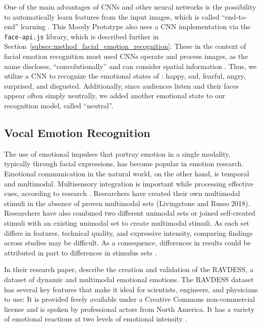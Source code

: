 One of the main advantages of CNNs and other neural networks is the possibility to automatically learn features from the input images, which is called ``end-to-end'' learning \cite{ko_brief_2018}. This Moody Prototype also uses a CNN implementation via the \texttt{face-api.js} library, which is described further in Section~\ref{subsec:method_facial_emotion_recognition}. These in the context of facial emotion recognition most used CNNs operate and process images, as the name discloses, ``convolutionally'' and can consider spatial information \cite{ko_brief_2018, rosler_reducing_2021}. Thus, we utilize a CNN to recognize the emotional states of : happy, sad, fearful, angry, surprised, and disgusted. Additionally, since audiences listen and their faces appear often simply neutrally, we added another emotional state to our recognition model, called ``neutral''.

\subsection{Vocal Emotion Recognition}
\label{subsec:related_work_vocal_emotion_recognition}
The use of emotional impulses that portray emotion in a single modality, typically through facial expressions, has become popular in emotion research. Emotional communication in the natural world, on the other hand, is temporal and multimodal. Multisensory integration is important while processing effective cues, according to research \cite{livingstone_ryerson_2018}. Researchers have created their own multimodal stimuli in the absence of proven multimodal sets (Livingstone and Russo 2018). Researchers have also combined two different unimodal sets \cite{delle-vigne_subclinical_2014} or joined self-created stimuli with an existing unimodal set \cite{zvyagintsev_attention_2013} to create multimodal stimuli. As each set differs in features, technical quality, and expressive intensity, comparing findings across studies may be difficult. As a consequence, differences in results could be attributed in part to differences in stimulus sets \cite{livingstone_ryerson_2018}.

In their research paper,  describe the creation and validation of the RAVDESS, a dataset of dynamic and multimodal emotional emotions. The RAVDESS dataset has several key features that make it ideal for scientists, engineers, and physicians to use: It is provided freely available under a Creative Commons non-commercial license and is spoken by professional actors from North America. It has a variety of emotional reactions at two levels of emotional intensity \cite{livingstone_ryerson_2018}. 

